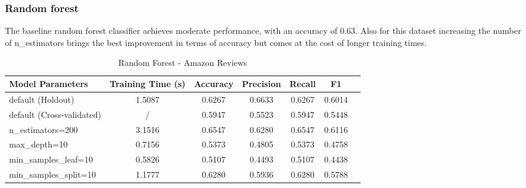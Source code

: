 \documentclass{article}
\begin{document}
\subsubsection*{Random forest}
The baseline random forest classifier achieves moderate performance, with an accuracy of 0.63. Also for this dataset increasing the number of n\_estimators brings the best improvement in terms of accuracy but comes at the cost of longer training times.
\begin{table}[ht]
\centering
\begin{tabular}{l|c|c|c|c|c|c}
\textbf{Model Parameters} & \textbf{Training Time (s)} & \textbf{Accuracy} & \textbf{Precision} & \textbf{Recall} & \textbf{F1} \\\hline
default (Holdout) & 1.5087  & 0.6267 & 0.6633 & 0.6267 & 0.6014 \\
default (Cross-validated) & /  & 0.5947 & 0.5523 & 0.5947 & 0.5448 \\
n\_estimators=200 & 3.1516  & 0.6547 & 0.6280 & 0.6547 & 0.6116 \\
max\_depth=10 & 0.7156  & 0.5373 & 0.4805 & 0.5373 & 0.4758 \\
min\_samples\_leaf=10 & 0.5826  & 0.5107 & 0.4493 & 0.5107 & 0.4438 \\
min\_samples\_split=10 & 1.1777  & 0.6280 & 0.5936 & 0.6280 & 0.5788 \\
\end{tabular}
\caption{Random Forest - Amazon Reviews}
\label{tab:Random Forest - Amazon Reviews}
\end{table}
\end{document}
